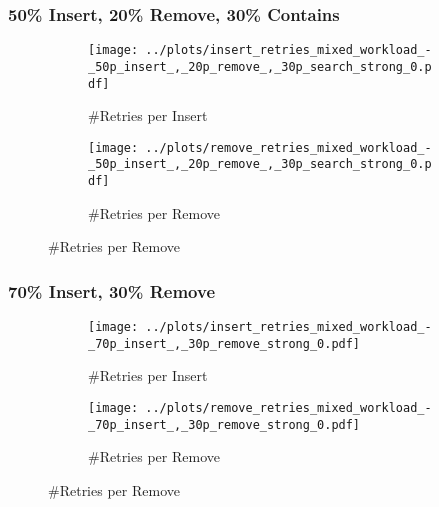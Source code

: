 \subsubsection*{50\% Insert, 20\% Remove, 30\% Contains}

\begin{figure}[H]
    \centering
    \begin{subfigure}[b]{0.49\textwidth}
        \texttt{[image: ../plots/insert\_retries\_mixed\_workload\_-\_50p\_insert\_,\_20p\_remove\_,\_30p\_search\_strong\_0.pdf]}
        \caption{\#Retries per Insert}
    \end{subfigure}
    \begin{subfigure}[b]{0.49\textwidth}
        \texttt{[image: ../plots/remove\_retries\_mixed\_workload\_-\_50p\_insert\_,\_20p\_remove\_,\_30p\_search\_strong\_0.pdf]}
        \caption{\#Retries per Remove}
    \end{subfigure}
\end{figure}

\subsubsection*{70\% Insert, 30\% Remove}

\begin{figure}[H]
    \centering
    \begin{subfigure}[b]{0.49\textwidth}
        \texttt{[image: ../plots/insert\_retries\_mixed\_workload\_-\_70p\_insert\_,\_30p\_remove\_strong\_0.pdf]}
        \caption{\#Retries per Insert}
    \end{subfigure}
       \begin{subfigure}[b]{0.49\textwidth}
        \texttt{[image: ../plots/remove\_retries\_mixed\_workload\_-\_70p\_insert\_,\_30p\_remove\_strong\_0.pdf]}
        \caption{\#Retries per Remove}
    \end{subfigure}
\end{figure}
